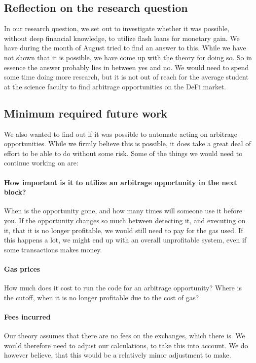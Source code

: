 \subsection{Reflection on the research question}
In our research question, we set out to investigate whether it was possible,
without deep financial knowledge, to utilize flash loans for monetary gain. We
have during the month of August tried to find an answer to this. While we have
not shown that it is possible, we have come up with the theory for doing so. So
in essence the answer probably lies in between yes and no. We would need to
spend some time doing more research, but it is not out of reach for the average
student at the science faculty to find arbitrage opportunities on the DeFi
market.

\subsection{Minimum required future work}
\noindent We also wanted to find out if it was possible to automate acting on
arbitrage opportunities. While we firmly believe this is possible, it does take
a great deal of effort to be able to do without some risk. Some of the things
we would need to continue working on are:

\paragraph{How important is it to utilize an arbitrage opportunity in the next
block?} When is the opportunity gone, and how many times will someone use it
before you. If the opportunity changes so much between detecting it, and
executing on it, that it is no longer profitable, we would still need to pay for
the gas used. If this happens a lot, we might end up with an overall
unprofitable system, even if some transactions makes money.
\paragraph{Gas prices} How much does it cost to run the code for an arbitrage
opportunity? Where is the cutoff, when it is no longer profitable due to the
cost of gas?
\paragraph{Fees incurred} Our theory assumes that there are no fees on the
exchanges, which there is. We would therefore need to adjust our calculations,
to take this into account. We do however believe, that this would be a
relatively minor adjustment to make.

